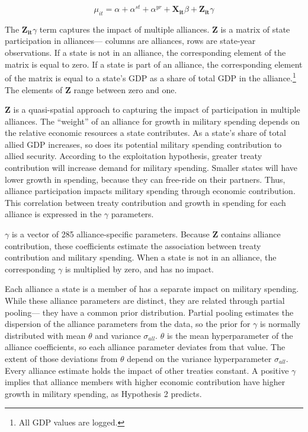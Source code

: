 \documentclass[12pt]{article}
\begin{document}
\begin{equation}
\mu_{it} = \alpha + \alpha^{st} + \alpha^{yr} + \mathbf{X_{it}} \beta + \mathbf{Z_{it}} \gamma 
\end{equation}


The $\mathbf{Z_{it}} \gamma$ term captures the impact of multiple alliances. 
\textbf{Z} is a matrix of state participation in alliances--- columns are alliances, rows are state-year observations. 
If a state is not in an alliance, the corresponding element of the matrix is equal to zero. 
If a state is part of an alliance, the corresponding element of the matrix is equal to a state's GDP as a share of total GDP in the alliance.\footnote{All GDP values are logged.} 
The elements of \textbf{Z} range between zero and one. 


\textbf{Z} is a quasi-spatial approach to capturing the impact of participation in multiple alliances.
The ``weight'' of an alliance for growth in military spending depends on the relative economic resources a state contributes.  
As a state's share of total allied GDP increases, so does its potential military spending contribution to allied security.  
According to the exploitation hypothesis, greater treaty contribution will increase demand for military spending. 
Smaller states will have lower growth in spending, because they can free-ride on their partners.
Thus, alliance participation impacts military spending through economic contribution. 
This correlation between treaty contribution and growth in spending for each alliance is expressed in the $\gamma$ parameters. 


$\gamma$ is a vector of 285 alliance-specific parameters.  
Because \textbf{Z} contains alliance contribution, these coefficients estimate the association between treaty contribution and military spending. 
When a state is not in an alliance, the corresponding $\gamma$ is multiplied by zero, and has no impact. 


Each alliance a state is a member of has a separate impact on military spending.
While these alliance parameters are distinct, they are related through partial pooling--- they have a common prior distribution.
Partial pooling estimates the dispersion of the alliance parameters from the data, so the prior for $\gamma$ is normally distributed with mean $\theta$ and variance $\sigma_{all}$. 
$\theta$ is the mean hyperparameter of the alliance coefficients, so each alliance parameter deviates from that value.
The extent of those deviations from $\theta$ depend on the variance hyperparameter $\sigma_{all}$.
Every alliance estimate holds the impact of other treaties constant. 
A positive $\gamma$ implies that alliance members with higher economic contribution have higher growth in military spending, as Hypothesis 2 predicts. 
    
\end{document}
